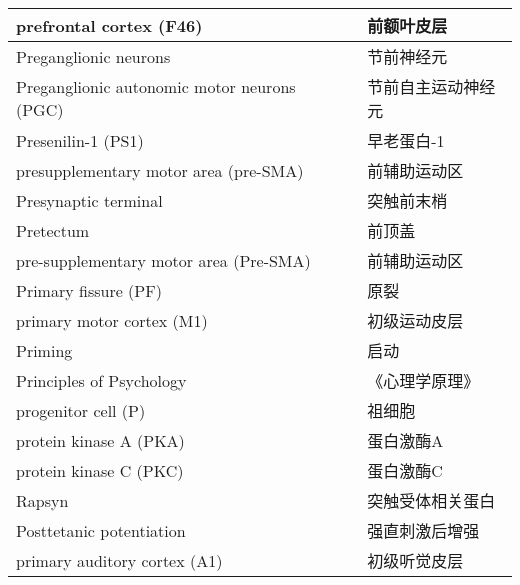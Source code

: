 \begin{longtable}{lll}
	\midrule
	prefrontal cortex (F46)     && 	前额叶皮层   \\
	
	\midrule
	Preganglionic neurons     && 	节前神经元   \\
	
	\midrule
	Preganglionic autonomic motor neurons (PGC)     && 	节前自主运动神经元   \\
	
	\midrule
	Presenilin-1 (PS1)     && 	早老蛋白-1   \\
	
	\midrule
	presupplementary motor area (pre-SMA)    && 	前辅助运动区   \\
	
	\midrule
	Presynaptic terminal     && 	突触前末梢   \\
	
	\midrule
	Pretectum     && 	前顶盖   \\
	
	\midrule
	pre-supplementary motor area (Pre-SMA)     && 	前辅助运动区   \\
	
	\midrule
	Primary fissure (PF)   && 原裂  \\
	
	\midrule
	primary motor cortex (M1)   && 初级运动皮层  \\
	
	\midrule
	Priming   && 启动  \\
	
	\midrule
	Principles of Psychology   && 《心理学原理》  \\
	
	\midrule
	progenitor cell (P)   && 祖细胞  \\
	
	\midrule
	protein kinase A (PKA)   && 蛋白激酶A  \\
	
	\midrule
	protein kinase C (PKC)   && 蛋白激酶C  \\
	
	\midrule
	Rapsyn   && 突触受体相关蛋白  \\
	
	\midrule
	Posttetanic potentiation   && 强直刺激后增强  \\
	
	\midrule
	primary auditory cortex (A1)   && 初级听觉皮层  \\
	

\end{longtable}
